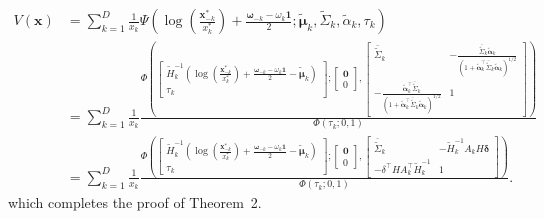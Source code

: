 \documentclass[12pt]{article}
\begin{document}
\begin{align*}
V(\bm x) &= \sum_{k=1}^D \frac{1}{x_k}
\Psi \left( \log \left( \frac{\bm x^*_{-k}}{x^*_k} \right) + \frac{\bm\omega_{-k} - \omega_k\bm 1}{2} ; \tilde{\bm \mu}_k, \tilde\Sigma_k, \tilde{\alpha}_k, \tau_k \right) \\
%
&= \sum_{k=1}^D \frac{1}{x_k} 
\frac{\Phi \left(
    \begin{bmatrix} 
        \tilde H_k^{-1}\left( \log \left( \frac{\bm x^*_{-k}}{x^*_k} \right) + \frac{\bm \omega_{-k} - \omega_k\bm 1}{2} - \tilde{\bm \mu}_k\right)  \\
        \tau_k
    \end{bmatrix};
    \begin{bmatrix} 
    \bm 0 \\ 0
    \end{bmatrix},
    \begin{bmatrix}
        \bar{\tilde\Sigma}_k & -\frac{\bar{\tilde\Sigma}_k \tilde{\bm\alpha}_k}{(1+\tilde{\bm\alpha}_k^\top\bar{\tilde\Sigma}_k \tilde{\bm\alpha}_k)^{1/2}} \\
       -\frac{\tilde{\bm\alpha}_k^\top\bar{\tilde\Sigma}_k}{\left(1+\tilde{\bm\alpha}_k^\top\bar{\tilde\Sigma}_k \tilde{\bm\alpha}_k\right)^{1/2}} &	1
    \end{bmatrix} \right)
    }
    {\Phi\left(\tau_k; 0, 1\right)} \\
&= \sum_{k=1}^D \frac{1}{x_k} 
\frac{\Phi \left(
    \begin{bmatrix} 
        \tilde H_k^{-1}\left( \log \left( \frac{\bm x^*_{-k}}{x^*_k} \right) + \frac{\bm\omega_{-k} - \omega_k\bm 1}{2} - \tilde{\bm \mu}_k\right)  \\
        \tau_k
    \end{bmatrix};
    \begin{bmatrix} 
    \bm 0 \\ 0
    \end{bmatrix},
    \begin{bmatrix}
        \bar{\tilde\Sigma}_k & - \tilde H_k^{-1} A_k H \bm \delta \\
       - \delta^\top H A_k^\top \tilde H_k^{-1} &	1
    \end{bmatrix} \right)
    }
    {\Phi\left(\tau_k; 0, 1\right)}.
\end{align*}
%
which completes the proof of Theorem~2.
\end{document}
